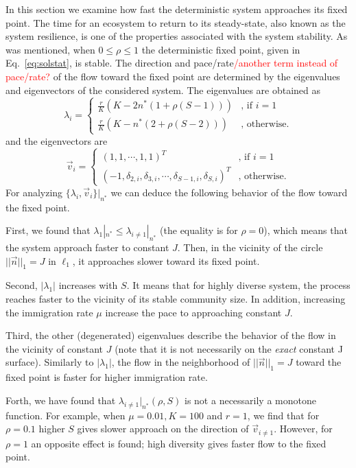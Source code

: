 \documentclass[%
 amsmath,amssymb,
 reprint,%
]{revtex4-2}
\begin{document}
In this section we examine how fast the deterministic system approaches its fixed point. The time for an ecosystem to return to its steady-state, also known as the system resilience, is one of the properties associated with the system stability.   As was mentioned, when $0\leq \rho\leq 1$ the deterministic fixed point, given in Eq.~\eqref{eq:solstat}, is stable. The direction and pace/rate\textcolor{red}{/another term instead of pace/rate? } of the flow toward the fixed point are determined by the eigenvalues and eigenvectors of the considered system.  The eigenvalues are obtained as 
\begin{equation}
\lambda_i =
\begin{cases}
\frac{r}{K}\left( K - 2 n^*(1+\rho(S-1)) \right) & \text{, if } i=1 \\
\frac{r}{K}\left( K - n^*(2+\rho(S-2)) \right) & \text{, otherwise}.
\end{cases}
\end{equation}
and the eigenvectors are 
\begin{equation}
\vec{v}_i =
\begin{cases}
(1,1,\cdots,1,1)^T & \text{, if } i=1 \\
(-1,\delta_{2,i},\delta_{3,i},\cdots,\delta_{S-1,i},\delta_{S,i})^T & \text{, otherwise}.
\end{cases}
\end{equation}
For analyzing $\{\lambda_i,\vec{v}_i\}|_{n^*}$ we can deduce the following behavior of the flow toward the fixed point.  

First, we found that $\lambda_1|_{n^*} \leq \lambda_{i\neq 1}|_{n^*}$ (the equality is for $\rho=0$), which means that the system approach faster to constant $J$. Then, in the vicinity of the circle $||\vec{n}||_1=J$ in $\ell_1$, it approaches slower toward its fixed point. 

Second, $|\lambda_1|$ increases with $S$. It means that for highly diverse system, the process reaches faster to the vicinity of its stable community size. In addition, increasing the immigration rate $\mu$ increase the pace to approaching constant $J$.   

Third, the other (degenerated) eigenvalues describe the behavior of the flow in the vicinity of constant $J$ (note that it is not necessarily on the {\em exact} constant J surface). Similarly to $|\lambda_1|$, the flow in the neighborhood of $||\vec{n}||_1=J$ toward the fixed point is faster for higher immigration rate. 

Forth, we have found that $\lambda_{i\neq 1}|_{n^*}(\rho,S)$ is not a necessarily a monotone function. For example, when $\mu=0.01, K=100$ and $r=1$, we find that for $\rho=0.1$ higher $S$ gives slower approach on the direction of $\vec{v}_{i\neq 1}$. However, for $\rho=1$ an opposite effect is found; high diversity gives faster flow to the fixed point.   
\end{document}
